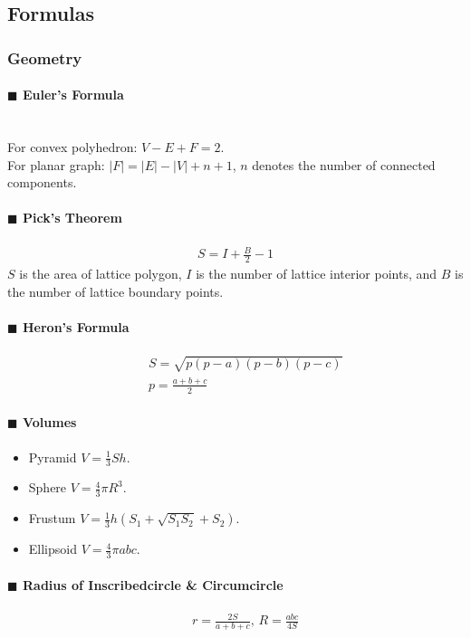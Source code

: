 \documentclass[10pt]{article}
\begin{document}
{\subsection{Formulas}
\subsubsection{Geometry}
\paragraph{$\blacksquare$ Euler's Formula}
\noindent \\
For convex polyhedron: $V-E+F=2$. \\
For planar graph: $|F|=|E|-|V|+n+1$, $n$ denotes the number of connected components.
\paragraph{$\blacksquare$ Pick's Theorem}
\begin{eqnarray*}
S=I+\frac{B}{2}-1
\end{eqnarray*}
$S$ is the area of lattice polygon, $I$ is the number of lattice interior points, and $B$ is the number of lattice boundary points.
\paragraph{$\blacksquare$ Heron's Formula}
\begin{eqnarray*}
&& S=\sqrt{p(p-a)(p-b)(p-c)} \\
&& p=\frac{a+b+c}{2}
\end{eqnarray*}
\paragraph{$\blacksquare$ Volumes}
\noindent
\begin{itemize}
\item Pyramid $V=\frac{1}{3}Sh$.
\item Sphere $V=\frac{4}{3}\pi R^3$.
\item Frustum $V=\frac{1}{3}h(S_1+\sqrt {S_1S_2}+S_2)$.
\item Ellipsoid $V=\frac{4}{3} \pi abc$.
\end{itemize}
\paragraph{$\blacksquare$ Radius of Inscribedcircle \& Circumcircle}
\begin{eqnarray*}
&& r=\frac{2S}{a+b+c},\, R=\frac{abc}{4S}
\end{eqnarray*}
}
\end{document}

